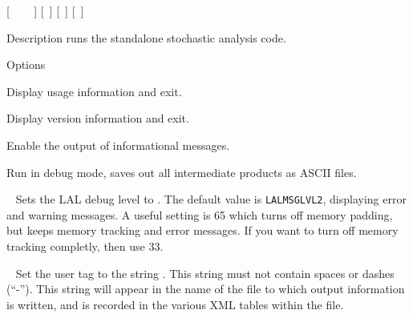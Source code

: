 \begin{entry}
 \newline \hspace*{0.5in}
 \newline \hspace*{0.5in}
[~ \newline \hspace*{0.5in}
~ \newline \hspace*{0.5in}
~] \newline \hspace*{0.5in}
[~] \newline \hspace*{0.5in}
[~] \newline \hspace*{0.5in}
[~]

\item[Description]
 runs the standalone stochastic analysis code.

\item[Options]\leavevmode
\begin{entry}
\item[\option{--help}]
Display usage information and exit.

\item[\option{--version}]
Display version information and exit.

\item[\option{--verbose}]
Enable the output of informational messages.

\item[\option{--debug}]
Run in debug mode, saves out all intermediate products as ASCII files.

\item[\option{--debug-level}~\parm{N}]
Sets the LAL debug level to . The default value is
\texttt{LALMSGLVL2}, displaying error and warning messages. A useful
setting is 65 which turns off memory padding, but keeps memory tracking
and error messages. If you want to turn off memory tracking completly,
then use 33.

\item[\option{--user-tag}~\parm{STRING}]
Set the user tag to the string . This string must not
contain spaces or dashes (``-''). This string will appear in the name of
the file to which output information is written, and is recorded in the
various XML tables within the file.


\end{entry}
\end{entry}

